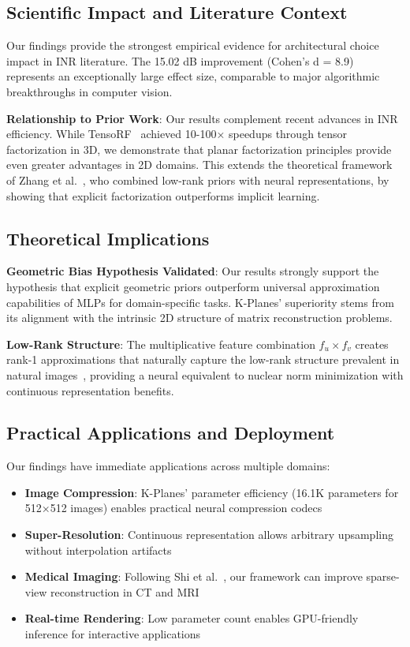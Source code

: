 \documentclass[10pt,twocolumn,letterpaper]{article}
\begin{document}
\subsection{Scientific Impact and Literature Context}

Our findings provide the strongest empirical evidence for architectural choice impact in INR literature. The 15.02 dB improvement (Cohen's d = 8.9) represents an exceptionally large effect size, comparable to major algorithmic breakthroughs in computer vision.

\textbf{Relationship to Prior Work}: Our results complement recent advances in INR efficiency. While TensoRF~\cite{chen2022tensorf} achieved 10-100× speedups through tensor factorization in 3D, we demonstrate that planar factorization principles provide even greater advantages in 2D domains. This extends the theoretical framework of Zhang et al.~\cite{zhang2025lorein}, who combined low-rank priors with neural representations, by showing that explicit factorization outperforms implicit learning.

\subsection{Theoretical Implications}

\textbf{Geometric Bias Hypothesis Validated}: Our results strongly support the hypothesis that explicit geometric priors outperform universal approximation capabilities of MLPs for domain-specific tasks. K-Planes' superiority stems from its alignment with the intrinsic 2D structure of matrix reconstruction problems.

\textbf{Low-Rank Structure}: The multiplicative feature combination $f_u \times f_v$ creates rank-1 approximations that naturally capture the low-rank structure prevalent in natural images~\cite{candes2009matrix}, providing a neural equivalent to nuclear norm minimization with continuous representation benefits.

\subsection{Practical Applications and Deployment}

Our findings have immediate applications across multiple domains:

\begin{itemize}
\item \textbf{Image Compression}: K-Planes' parameter efficiency (16.1K parameters for 512×512 images) enables practical neural compression codecs
\item \textbf{Super-Resolution}: Continuous representation allows arbitrary upsampling without interpolation artifacts
\item \textbf{Medical Imaging}: Following Shi et al.~\cite{shi2024inr}, our framework can improve sparse-view reconstruction in CT and MRI
\item \textbf{Real-time Rendering}: Low parameter count enables GPU-friendly inference for interactive applications
\end{itemize}
\end{document}
